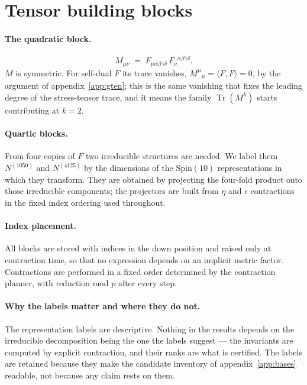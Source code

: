 \section{Tensor building blocks}
\label{app:blocks}

\paragraph{The quadratic block.}
\begin{equation}
M_{\mu\nu} \;=\; F_{\mu\alpha\beta\gamma\delta}\,
                 F_\nu{}^{\alpha\beta\gamma\delta}.
\end{equation}
$M$ is symmetric. For self-dual $F$ its trace vanishes,
$M^\mu{}_\mu = \langle F,F\rangle = 0$, by the argument of
appendix~\ref{app:gten}; this is the same vanishing that fixes the leading degree
of the stress-tensor trace, and it means the family
$\operatorname{Tr}(M^k)$ starts contributing at $k = 2$.

\paragraph{Quartic blocks.}
From four copies of $F$ two irreducible structures are needed. We label them
$N^{(1050)}$ and $N^{(4125)}$ by the dimensions of the $\mathrm{Spin}(10)$
representations in which they transform. They are obtained by projecting the
four-fold product onto those irreducible components; the projectors are built
from $\eta$ and $\epsilon$ contractions in the fixed index ordering used
throughout.

\paragraph{Index placement.}
All blocks are stored with indices in the down position and raised only at
contraction time, so that no expression depends on an implicit metric factor.
Contractions are performed in a fixed order determined by the contraction planner,
with reduction mod $p$ after every step.

\paragraph{Why the labels matter and where they do not.}
The representation labels are descriptive. Nothing in the results depends on the
irreducible decomposition being the one the labels suggest --- the invariants are
computed by explicit contraction, and their ranks are what is certified. The
labels are retained because they make the candidate inventory of
appendix~\ref{app:bases} readable, not because any claim rests on them.

